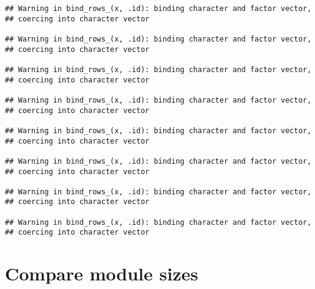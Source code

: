 \documentclass[]{article}
\newenvironment{Shaded}{\begin{snugshade}}{\end{snugshade}}
\newcommand{\CommentTok}[1]{\textcolor[rgb]{0.56,0.35,0.01}{\textit{#1}}}
\newcommand{\DecValTok}[1]{\textcolor[rgb]{0.00,0.00,0.81}{#1}}
\newcommand{\KeywordTok}[1]{\textcolor[rgb]{0.13,0.29,0.53}{\textbf{#1}}}
\newcommand{\NormalTok}[1]{#1}
\newcommand{\OperatorTok}[1]{\textcolor[rgb]{0.81,0.36,0.00}{\textbf{#1}}}
\newcommand{\StringTok}[1]{\textcolor[rgb]{0.31,0.60,0.02}{#1}}
\begin{document}
\begin{verbatim}
## Warning in bind_rows_(x, .id): binding character and factor vector,
## coercing into character vector

## Warning in bind_rows_(x, .id): binding character and factor vector,
## coercing into character vector

## Warning in bind_rows_(x, .id): binding character and factor vector,
## coercing into character vector

## Warning in bind_rows_(x, .id): binding character and factor vector,
## coercing into character vector

## Warning in bind_rows_(x, .id): binding character and factor vector,
## coercing into character vector

## Warning in bind_rows_(x, .id): binding character and factor vector,
## coercing into character vector

## Warning in bind_rows_(x, .id): binding character and factor vector,
## coercing into character vector

## Warning in bind_rows_(x, .id): binding character and factor vector,
## coercing into character vector
\end{verbatim}

\begin{Shaded}
\end{Shaded}

\hypertarget{compare-module-sizes}{%
\section{Compare module sizes}\label{compare-module-sizes}}
\end{document}
